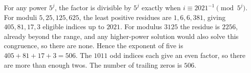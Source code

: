 For any power $5^j$, the factor is divisible by $5^j$ exactly when $i\equiv2021^{-1}\pmod{5^j}$. For moduli $5,25,125,625$, the least positive residues are $1,6,6,381$, giving $405,81,17,3$ eligible indices up to $2021$. For modulus $3125$ the residue is $2256$, already beyond the range, and any higher-power solution would also solve this congruence, so there are none. Hence the exponent of five is $405+81+17+3=506$. The $1011$ odd indices each give an even factor, so there are more than enough twos. The number of trailing zeros is $\boxed{506}$.
